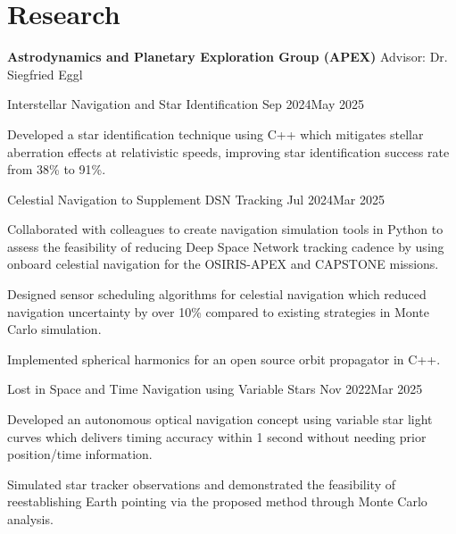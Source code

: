 \documentclass[letterpaper,12pt]{article}
\begin{document}
	
	
	\section{Research}
	
	\textbf{Astrodynamics and Planetary Exploration Group (APEX)} 
	\hfill Advisor: Dr. Siegfried Eggl
	
	\begin{ResearchExperience}
		{Interstellar Navigation and Star Identification}
		{Sep 2024}{May 2025}
			\item Developed a star identification technique using C++ which mitigates stellar aberration effects at relativistic speeds, improving star identification success rate from 38\% to 91\%.
	\end{ResearchExperience}

	\begin{ResearchExperience}
		{Celestial Navigation to Supplement DSN Tracking}
		{Jul 2024}{Mar 2025}
			\item Collaborated with colleagues to create navigation simulation tools in Python to assess the feasibility of reducing Deep Space Network tracking cadence by using onboard celestial navigation for the OSIRIS-APEX and CAPSTONE missions.
			\item Designed sensor scheduling algorithms for celestial navigation which reduced navigation uncertainty by over 10\% compared to existing strategies in Monte Carlo simulation. 
			\item Implemented spherical harmonics for an open source orbit propagator in C++.
	\end{ResearchExperience}

	\begin{ResearchExperience}
		{Lost in Space and Time Navigation using Variable Stars}
		{Nov 2022}{Mar 2025}
			\item Developed an autonomous optical navigation concept using variable star light curves which delivers timing accuracy within 1 second without needing prior position/time information.
			\item Simulated star tracker observations and demonstrated the feasibility of reestablishing Earth pointing via the proposed method through Monte Carlo analysis.
	\end{ResearchExperience}
	
\end{document}
